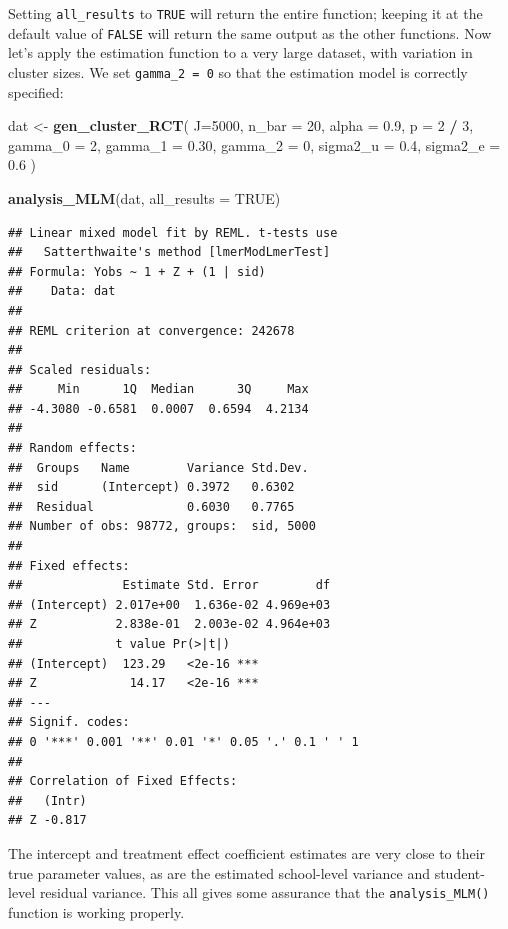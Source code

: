 \documentclass[
]{book}
\newenvironment{Shaded}{\begin{snugshade}}{\end{snugshade}}
\newcommand{\AttributeTok}[1]{\textcolor[rgb]{0.13,0.29,0.53}{#1}}
\newcommand{\ConstantTok}[1]{\textcolor[rgb]{0.56,0.35,0.01}{#1}}
\newcommand{\DecValTok}[1]{\textcolor[rgb]{0.00,0.00,0.81}{#1}}
\newcommand{\FloatTok}[1]{\textcolor[rgb]{0.00,0.00,0.81}{#1}}
\newcommand{\FunctionTok}[1]{\textcolor[rgb]{0.13,0.29,0.53}{\textbf{#1}}}
\newcommand{\NormalTok}[1]{#1}
\newcommand{\OtherTok}[1]{\textcolor[rgb]{0.56,0.35,0.01}{#1}}
\newcommand{\SpecialCharTok}[1]{\textcolor[rgb]{0.81,0.36,0.00}{\textbf{#1}}}
\begin{document}
Setting \texttt{all\_results} to \texttt{TRUE} will return the entire function; keeping it at the default value of \texttt{FALSE} will return the same output as the other functions.
Now let's apply the estimation function to a very large dataset, with variation in cluster sizes.
We set \texttt{gamma\_2\ =\ 0} so that the estimation model is correctly specified:

\begin{Shaded}
\begin{Highlighting}[]
\NormalTok{dat }\OtherTok{\textless{}{-}} \FunctionTok{gen\_cluster\_RCT}\NormalTok{( }
  \AttributeTok{J=}\DecValTok{5000}\NormalTok{, }\AttributeTok{n\_bar =} \DecValTok{20}\NormalTok{, }\AttributeTok{alpha =} \FloatTok{0.9}\NormalTok{, }\AttributeTok{p =} \DecValTok{2} \SpecialCharTok{/} \DecValTok{3}\NormalTok{, }
  \AttributeTok{gamma\_0 =} \DecValTok{2}\NormalTok{, }\AttributeTok{gamma\_1 =} \FloatTok{0.30}\NormalTok{, }\AttributeTok{gamma\_2 =} \DecValTok{0}\NormalTok{,}
  \AttributeTok{sigma2\_u =} \FloatTok{0.4}\NormalTok{, }\AttributeTok{sigma2\_e =} \FloatTok{0.6}
\NormalTok{)}

\FunctionTok{analysis\_MLM}\NormalTok{(dat, }\AttributeTok{all\_results =} \ConstantTok{TRUE}\NormalTok{)}
\end{Highlighting}
\end{Shaded}

\begin{verbatim}
## Linear mixed model fit by REML. t-tests use
##   Satterthwaite's method [lmerModLmerTest]
## Formula: Yobs ~ 1 + Z + (1 | sid)
##    Data: dat
## 
## REML criterion at convergence: 242678
## 
## Scaled residuals: 
##     Min      1Q  Median      3Q     Max 
## -4.3080 -0.6581  0.0007  0.6594  4.2134 
## 
## Random effects:
##  Groups   Name        Variance Std.Dev.
##  sid      (Intercept) 0.3972   0.6302  
##  Residual             0.6030   0.7765  
## Number of obs: 98772, groups:  sid, 5000
## 
## Fixed effects:
##              Estimate Std. Error        df
## (Intercept) 2.017e+00  1.636e-02 4.969e+03
## Z           2.838e-01  2.003e-02 4.964e+03
##             t value Pr(>|t|)    
## (Intercept)  123.29   <2e-16 ***
## Z             14.17   <2e-16 ***
## ---
## Signif. codes:  
## 0 '***' 0.001 '**' 0.01 '*' 0.05 '.' 0.1 ' ' 1
## 
## Correlation of Fixed Effects:
##   (Intr)
## Z -0.817
\end{verbatim}

The intercept and treatment effect coefficient estimates are very close to their true parameter values, as are the estimated school-level variance and student-level residual variance.
This all gives some assurance that the \texttt{analysis\_MLM()} function is working properly.
\end{document}
